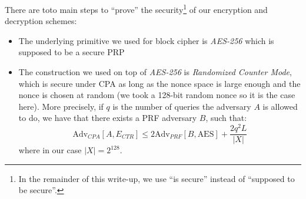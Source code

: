 \documentclass[10pt,twocolumn]{article}
\begin{document}
There are toto main steps to ``prove'' the security\footnote{In the remainder of this write-up, we use ``is secure''
instead of ``supposed to be secure''.}  of our encryption and decryption schemes:
\begin{itemize}
\item The underlying primitive we used for block cipher is \emph{AES-256} which is supposed to be a secure PRP
\item The construction we used on top of \emph{AES-256} is \emph{Randomized Counter Mode}, which is secure under CPA as long as the nonce space is large enough and the nonce is chosen at random (we took a 128-bit random nonce so it is the case here).
More precisely, if $q$ is the number of queries the adversary $A$ is allowed to do, we have that there exists a PRF adversary $B$, such that:
\[
 \text{Adv}_{CPA}[A,E_{CTR}] \leq 2 \text{Adv}_{PRF}[B,\text{AES}] + \frac{2q^2L}{|X|} 
\]
where in our case $|X| = 2^{128}$.

% 


\end{itemize}
\end{document}
